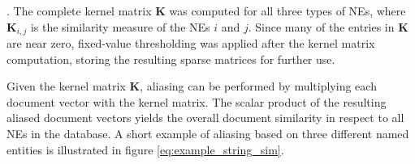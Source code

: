 . The complete kernel matrix $\textbf{K}$ was computed for all three types of NEs, where $\textbf{K}_{i,j}$ is the similarity measure of the NEs $i$ and $j$. Since many of the entries in $\textbf{K}$ are near zero, fixed-value thresholding was applied after the kernel matrix computation, storing the resulting sparse matrices for further use.

Given the kernel matrix $\textbf{K}$, aliasing can be performed by multiplying each document vector with the kernel matrix. The scalar product of the resulting aliased document vectors yields the overall document similarity in respect to all NEs in the database. A short example of aliasing based on three different named entities is illustrated in figure \ref{eq:example_string_sim}.